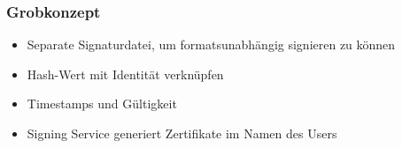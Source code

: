 \documentclass[12pt,xcolor=pdftex,dvipsnames,table]{beamer}
\newcommand{\Subitem}[1]{
{\setlength\itemindent{15pt} \item[-] #1}
}
\begin{document}

    \begin{frame}
        \frametitle{Grobkonzept}
        \begin{itemize}
            \item Separate Signaturdatei, um formatsunabhängig signieren zu können
            \item Hash-Wert mit Identität verknüpfen
            \item Timestamps und Gültigkeit
            \item Signing Service generiert Zertifikate im Namen des Users
        \end{itemize}
    \end{frame}
\end{document}
